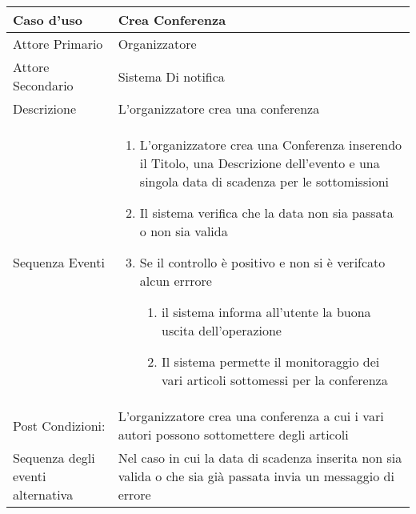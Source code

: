 \begin{tabular}{|p{3cm}|p{7cm}|}
\hline 
\rowcolor{Orchid}
Caso d'uso & Crea Conferenza \\
\hline
Attore Primario & Organizzatore\\
\hline
Attore Secondario & Sistema Di notifica\\
\hline
Descrizione & L'organizzatore crea una conferenza \\
\hline
  Sequenza Eventi &
                    \begin{enumerate}
                    \item L'organizzatore crea una Conferenza inserendo il Titolo, una Descrizione dell'evento e una singola data di scadenza per le sottomissioni
                    \item Il sistema verifica che la data non sia passata o non sia valida
                    \item Se il controllo è positivo e non si è verifcato alcun errrore
                      \begin{enumerate}
                      \item il sistema informa all'utente la buona uscita dell'operazione
                      \item Il sistema permette il monitoraggio dei vari articoli sottomessi per la conferenza
                      \end{enumerate}
                    \end{enumerate}\\
\hline
Post Condizioni: & L'organizzatore crea una conferenza a cui i vari autori possono sottomettere degli articoli \\
\hline
Sequenza degli eventi alternativa & Nel caso in cui la data di scadenza inserita non sia valida o che sia già passata invia un messaggio di errore \\
\hline
\end{tabular}

